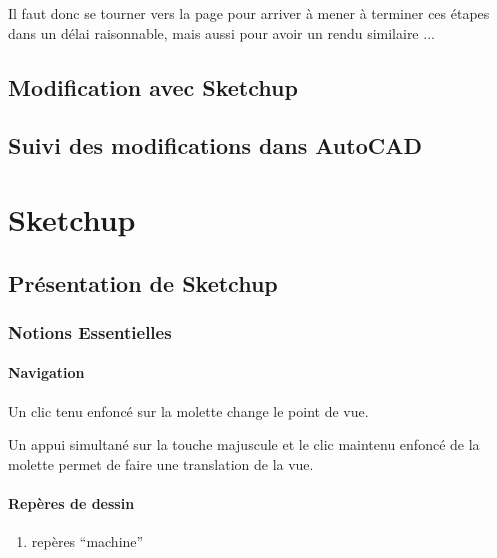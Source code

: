 \documentclass[a4paper,12pt,french]{sphinxmanual}
\begin{document}
Il faut donc se tourner vers la page {\hyperref[acad/config_acad:config\string-acad]{}} pour arriver à mener à terminer ces étapes dans un délai raisonnable, mais aussi pour avoir un rendu similaire ...


\section{Modification avec Sketchup}
\label{init_su+acad/005_su2:modification-avec-sketchup}\label{init_su+acad/005_su2::doc}

\section{Suivi des modifications dans AutoCAD}
\label{init_su+acad/006_acad2::doc}\label{init_su+acad/006_acad2:suivi-des-modifications-dans-autocad}

\chapter{Sketchup}
\label{su/index:sketchup}\label{su/index::doc}\label{su/index:index-su}

\section{Présentation de Sketchup}
\label{su/intro-su:presentation-de-sketchup}\label{su/intro-su::doc}

\subsection{Notions Essentielles}
\label{su/intro-su:notions-essentielles}\label{su/intro-su:notions-essentielles-su}

\subsubsection{Navigation}
\label{su/intro-su:navigation}
Un clic tenu enfoncé sur la molette change le point de vue.

Un appui simultané sur la touche majuscule et le clic maintenu enfoncé de la molette permet de faire une translation de la vue.


\subsubsection{Repères de dessin}
\label{su/intro-su:reperes-de-dessin}\begin{enumerate}
\item {} 
repères ``machine''

\end{enumerate}
\end{document}
